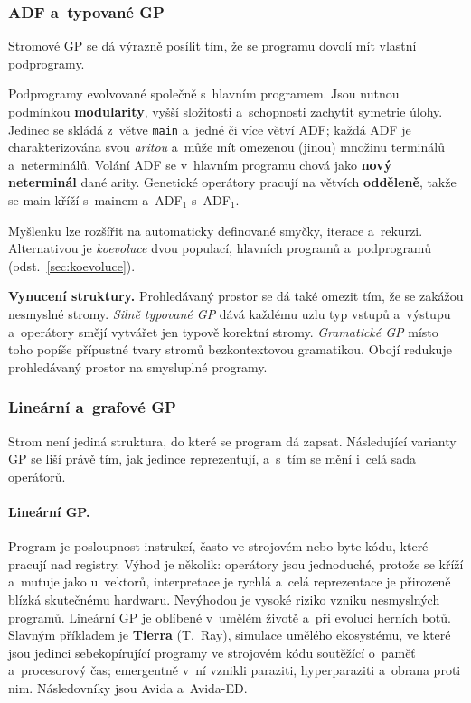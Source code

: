 \documentclass[11pt,a4paper]{article}
\theoremstyle{definition}
\begin{document}
\subsubsection{ADF a~typované GP}

Stromové GP se dá výrazně posílit tím, že se programu dovolí mít vlastní podprogramy.

\begin{defbox}
Podprogramy evolvované společně s~hlavním programem. Jsou nutnou podmínkou
\textbf{modularity}, vyšší složitosti a~schopnosti zachytit symetrie úlohy. Jedinec se
skládá z~větve \texttt{main} a~jedné či více větví ADF; každá ADF je charakterizována
svou \emph{aritou} a~může mít omezenou (jinou) množinu terminálů a~neterminálů. Volání
ADF se v~hlavním programu chová jako \textbf{nový neterminál} dané arity. Genetické
operátory pracují na větvích \textbf{odděleně}, takže se main kříží s~mainem a~ADF$_1$
s~ADF$_1$.

Myšlenku lze rozšířit na automaticky definované smyčky, iterace a~rekurzi. Alternativou
je \emph{koevoluce} dvou populací, hlavních programů a~podprogramů
(odst.~\ref{sec:koevoluce}).
\end{defbox}

\textbf{Vynucení struktury.} Prohledávaný prostor se dá také omezit tím, že se zakážou
nesmyslné stromy. \emph{Silně typované GP} dává každému uzlu typ vstupů a~výstupu
a~operátory smějí vytvářet jen typově korektní stromy. \emph{Gramatické GP} místo toho
popíše přípustné tvary stromů bezkontextovou gramatikou. Obojí redukuje prohledávaný
prostor na smysluplné programy.

\subsubsection{Lineární a~grafové GP}

Strom není jediná struktura, do které se program dá zapsat. Následující varianty GP se
liší právě tím, jak jedince reprezentují, a~s~tím se mění i~celá sada operátorů.

\paragraph{Lineární GP.} Program je posloupnost instrukcí, často ve strojovém nebo byte
kódu, které pracují nad registry. Výhod je několik: operátory jsou jednoduché, protože
se kříží a~mutuje jako u~vektorů, interpretace je rychlá a~celá reprezentace je
přirozeně blízká skutečnému hardwaru. Nevýhodou je vysoké riziko vzniku nesmyslných
programů. Lineární GP je oblíbené v~umělém životě a~při evoluci herních botů. Slavným
příkladem je \textbf{Tierra} (T.~Ray), simulace umělého ekosystému, ve které jsou
jedinci sebekopírující programy ve strojovém kódu soutěžící o~paměť a~procesorový čas;
emergentně v~ní vznikli paraziti, hyperparaziti a~obrana proti nim. Následovníky jsou
Avida a~Avida-ED.
\end{document}
